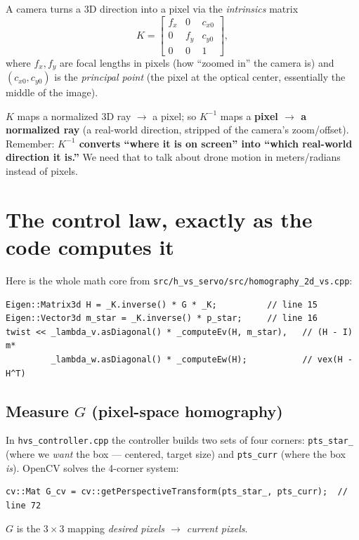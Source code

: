 \documentclass[11pt]{article}
\begin{document}
A camera turns a 3D direction into a pixel via the \emph{intrinsics} matrix
\[
K=\begin{bmatrix} f_x&0&c_{x0}\\ 0&f_y&c_{y0}\\ 0&0&1\end{bmatrix},
\]
where $f_x,f_y$ are focal lengths in pixels (how ``zoomed in'' the camera is)
and $(c_{x0},c_{y0})$ is the \emph{principal point} (the pixel at the optical
center, essentially the middle of the image).

$K$ maps a normalized 3D ray $\to$ a pixel; so $K^{-1}$ maps a
\textbf{pixel $\to$ a normalized ray} (a real-world direction, stripped of the
camera's zoom/offset). Remember: \textbf{$K^{-1}$ converts ``where it is on
screen'' into ``which real-world direction it is.''} We need that to talk about
drone motion in meters/radians instead of pixels.

\section{The control law, exactly as the code computes it}
\label{sec:law}

Here is the whole math core from
\texttt{src/h\_vs\_servo/src/homography\_2d\_vs.cpp}:

\begin{lstlisting}
Eigen::Matrix3d H = _K.inverse() * G * _K;          // line 15
Eigen::Vector3d m_star = _K.inverse() * p_star;     // line 16
twist << _lambda_v.asDiagonal() * _computeEv(H, m_star),   // (H - I) m*
         _lambda_w.asDiagonal() * _computeEw(H);           // vex(H - H^T)
\end{lstlisting}

\subsection{Measure $G$ (pixel-space homography)}
In \texttt{hvs\_controller.cpp} the controller builds two sets of four corners:
\texttt{pts\_star\_} (where we \emph{want} the box --- centered, target size)
and \texttt{pts\_curr} (where the box \emph{is}). OpenCV solves the 4-corner
system:
\begin{lstlisting}
cv::Mat G_cv = cv::getPerspectiveTransform(pts_star_, pts_curr);  // line 72
\end{lstlisting}
$G$ is the $3\times3$ mapping \emph{desired pixels $\to$ current pixels}.
\end{document}
